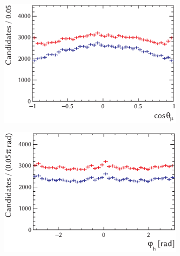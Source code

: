 \begin{figure}[p]
  \vspace*{0.02\textwidth}
  \begin{subfigure}{0.49\textwidth}
    \includegraphics[width=\textwidth]{graphics/analysis/ctl_bkgSub}
    \caption{}
    \label{fig:ctlBkgSub}
  \end{subfigure}%
  \hfill%
  \begin{subfigure}{0.49\textwidth}
    \includegraphics[width=\textwidth]{graphics/analysis/phi_bkgSub}
    \caption{}
    \label{fig:phiBkgSub}
  \end{subfigure}


\end{figure}
